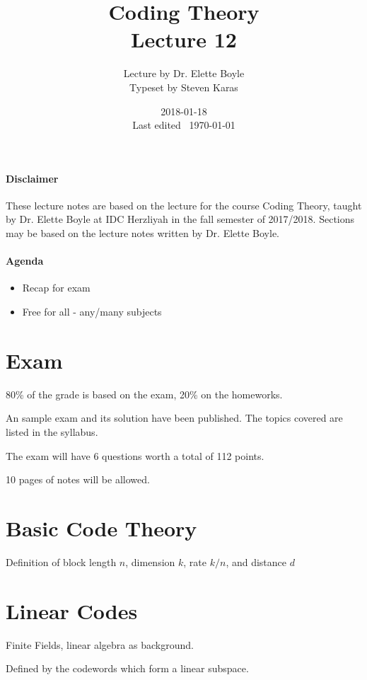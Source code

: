 \documentclass{idc_msc}
\title{Coding Theory\\\large Lecture 12}
\date{2018-01-18 \\ Last edited \currenttime\ \today}
\author{Lecture by Dr. Elette Boyle\\Typeset by Steven Karas}
\begin{document}
\maketitle

\paragraph{Disclaimer}

These lecture notes are based on the lecture for the course Coding Theory, taught by Dr. Elette Boyle at IDC Herzliyah in the fall semester of 2017/2018.
Sections may be based on the lecture notes written by Dr. Elette Boyle.

\paragraph{Agenda}

\begin{itemize}
  \item Recap for exam
  \item Free for all - any/many subjects
\end{itemize}

\section{Exam}

80\% of the grade is based on the exam, 20\% on the homeworks.

An sample exam and its solution have been published.
The topics covered are listed in the syllabus.

The exam will have 6 questions worth a total of 112 points.

10 pages of notes will be allowed.

\section{Basic Code Theory}

Definition of block length \(n\), dimension \(k\), rate \(k/n\), and distance \(d\)

\section{Linear Codes}

Finite Fields, linear algebra as background.

Defined by the codewords which form a linear subspace.
\end{document}
